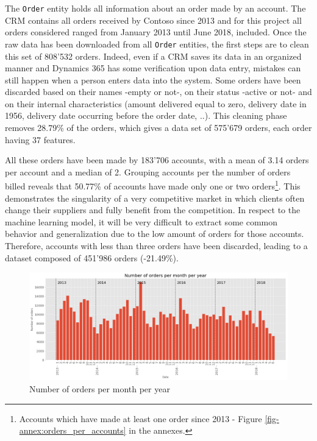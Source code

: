 The \texttt{Order} entity holds all information about an order made by an account. The CRM contains all orders received by Contoso since 2013 and for this project all orders considered ranged from January 2013 until June 2018, included. Once the raw data has been downloaded from all \texttt{Order} entities, the first steps are to clean this set of 808'532 orders. Indeed, even if a CRM saves its data in an organized manner and Dynamics 365 has some verification upon data entry, mistakes can still happen when a person enters data into the system. Some orders have been discarded based on their names -empty or not-, on their status -active or not- and on their internal characteristics (amount delivered equal to zero, delivery date in 1956, delivery date occurring before the order date, ..). This cleaning phase removes 28.79\% of the orders, which gives a data set of 575'679 orders, each order having 37 features.

All these orders have been made by 183'706 accounts, with a mean of 3.14 orders per account and a median of 2. Grouping accounts per the number of orders billed reveals that 50.77\% of accounts have made only one or two orders\footnote{Accounts which have made at least one order since 2013 - Figure \ref{fig-annex:orders_per_accounts} in the annexes.}. This demonstrates the singularity of a very competitive market in which clients often change their suppliers and fully benefit from the competition. In respect to the machine learning model, it will be very difficult to extract some common behavior and generalization due to the low amount of orders for those accounts. Therefore, accounts with less than three orders have been discarded, leading to a dataset composed of 451'986 orders (-21.49\%).

\begin{figure}[h]
    \centering
    \includegraphics[width=15cm]{images/order_month_year.png}
    \caption{Number of orders per month per year}
    \label{fig:order_per_monthyear}
\end{figure}

